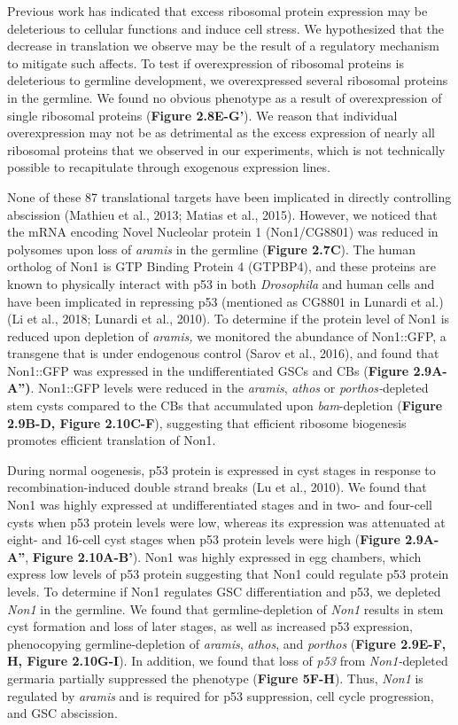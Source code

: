 \documentclass[12pt,oneside]{reedthesis}
\begin{document}
Previous work has indicated that excess ribosomal protein expression may
be deleterious to cellular functions and induce cell stress. We
hypothesized that the decrease in translation we observe may be the
result of a regulatory mechanism to mitigate such affects. To test if
overexpression of ribosomal proteins is deleterious to germline
development, we overexpressed several ribosomal proteins in the
germline. We found no obvious phenotype as a result of overexpression of
single ribosomal proteins (\textbf{Figure 2.8E-G'}). We reason that individual
overexpression may not be as detrimental as the excess expression of
nearly all ribosomal proteins that we observed in our experiments, which
is not technically possible to recapitulate through exogenous expression
lines.

None of these 87 translational targets have been implicated in directly
controlling abscission (Mathieu et al., 2013; Matias et al., 2015). However, we
noticed that the mRNA encoding Novel Nucleolar protein 1 (Non1/CG8801)
was reduced in polysomes upon loss of \emph{aramis} in the germline (\textbf{Figure 2.7C}).
The human ortholog of Non1 is GTP Binding Protein 4 (GTPBP4), and
these proteins are known to physically interact with p53 in both
\emph{Drosophila} and human cells and have been implicated in repressing p53
(mentioned as CG8801 in Lunardi et al.) (Li et al., 2018; Lunardi et al., 2010).
To determine if the protein level of Non1 is reduced upon depletion of
\emph{aramis,} we monitored the abundance of Non1::GFP, a transgene that is
under endogenous control (Sarov et al., 2016), and
found that Non1::GFP was expressed in the undifferentiated GSCs and CBs
(\textbf{Figure 2.9A-A'')}. Non1::GFP levels were reduced in the \emph{aramis},
\emph{athos} or \emph{porthos-}depleted stem cysts compared to the CBs that
accumulated upon \emph{bam}-depletion (\textbf{Figure 2.9B-D, Figure 2.10C-F}),
suggesting that efficient ribosome biogenesis promotes efficient
translation of Non1.

During normal oogenesis, p53 protein is expressed in cyst stages in
response to recombination-induced double strand breaks
(Lu et al., 2010). We found that Non1 was highly
expressed at undifferentiated stages and in two- and four-cell cysts
when p53 protein levels were low, whereas its expression was attenuated
at eight- and 16-cell cyst stages when p53 protein levels were high
(\textbf{Figure 2.9A-A''}, \textbf{Figure 2.10A-B'}). Non1 was highly expressed in egg
chambers, which express low levels of p53 protein suggesting that Non1
could regulate p53 protein levels. To determine if Non1 regulates GSC
differentiation and p53, we depleted \emph{Non1} in the germline. We found
that germline-depletion of \emph{Non1} results in stem cyst formation and
loss of later stages, as well as increased p53 expression, phenocopying
germline-depletion of \emph{aramis}, \emph{athos}, and \emph{porthos} (\textbf{Figure 2.9E-F, H, Figure 2.10G-I}). In addition, we found that loss of \emph{p53} from
\emph{Non1-}depleted germaria partially suppressed the phenotype (\textbf{Figure
5F-H}). Thus, \emph{Non1} is regulated by \emph{aramis} and is required for p53
suppression, cell cycle progression, and GSC abscission.
\end{document}
